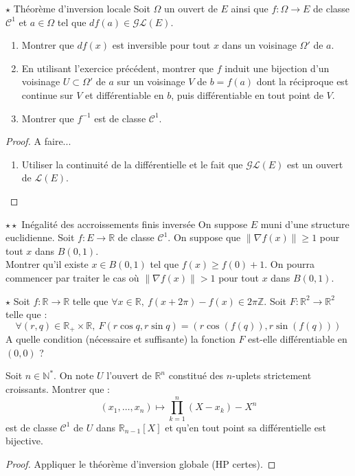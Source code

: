 \documentclass[french,a4paper]{article}
\newcommand{\N}{\mathbb{N}}
\newcommand{\Z}{\mathbb{Z}}
\newcommand{\R}{\mathbb{R}}
\newcommand{\st}{^*}
\newcommand{\inv}{^{-1}}
\theoremstyle{plain}
\theoremstyle{definition}
\theoremstyle{remark}
\begin{document}
\begin{ex}[Moulin.18]{$\star$ Théorème d'inversion locale}
	Soit $\Omega$ un ouvert de $E$ ainsi que $f:\Omega\to E$ de classe $\mathcal{C}^1$ et $a\in\Omega$ tel que $df(a)\in\mathcal{GL}(E)$.
	\begin{enumerate}
		\item Montrer que $df(x)$ est inversible pour tout $x$ dans un voisinage $\Omega'$ de $a$.
		\item En utilisant l'exercice précédent, montrer que $f$ induit une bijection d'un voisinage $U\subset\Omega'$ de $a$ sur un voisinage $V$ de $b=f(a)$ dont la réciproque est continue sur $V$ et différentiable en $b$, puis différentiable en tout point de $V$.
		\item Montrer que $f\inv$ est de classe $\mathcal{C}^1$.
	\end{enumerate}
\end{ex}
\begin{proof}
	A faire...
	\begin{enumerate}
		\item Utiliser la continuité de la différentielle et le fait que $\mathcal{GL}(E)$ est un ouvert de $\mathcal{L}(E)$.
	\end{enumerate}
\end{proof}

\begin{ex}[Moulin.19]{$\star\star$ Inégalité des accroissements finis inversée}
	On suppose $E$ muni d'une structure euclidienne. Soit $f:E\to\R$ de classe $\mathcal{C}^1$. On suppose que $\lVert\nabla f(x)\rVert\geqslant 1$ pour tout $x$ dans $B(0,1)$. \\
	Montrer qu'il existe $x\in B(0,1)$ tel que $f(x)\geqslant f(0)+1$. On pourra commencer par traiter le cas où $\lVert\nabla f(x)\rVert>1$ pour tout $x$ dans $B(0,1)$.
\end{ex}

\begin{ex}[Moulin.20 / X]{$\star$}
	Soit $f:\R\to\R$ telle que $\forall x\in\R,\ f(x+2\pi)-f(x)\in 2\pi\Z$. Soit $F:\R^2\to\R^2$ telle que : $$\forall (r,q)\in\R_+\times\R,\ F(r\cos q,r\sin q)=(r\cos(f(q)),r\sin(f(q)))$$ A quelle condition (nécessaire et suffisante) la fonction $F$ est-elle différentiable en $(0,0)$ ?
\end{ex}

\begin{ex}[Moulin.21]{}
	Soit $n\in\N\st$. On note $U$ l'ouvert de $\R^n$ constitué des $n$-uplets strictement croissants. Montrer que : $$(x_1,\ldots,x_n)\mapsto\prod_{k=1}^{n}(X-x_k)-X^n$$ est de classe $\mathcal{C}^1$ de $U$ dans $\R_{n-1}[X]$ et qu'en tout point sa différentielle est bijective.
\end{ex}
\begin{proof}
	Appliquer le théorème d'inversion globale (HP certes).
\end{proof}
\end{document}
